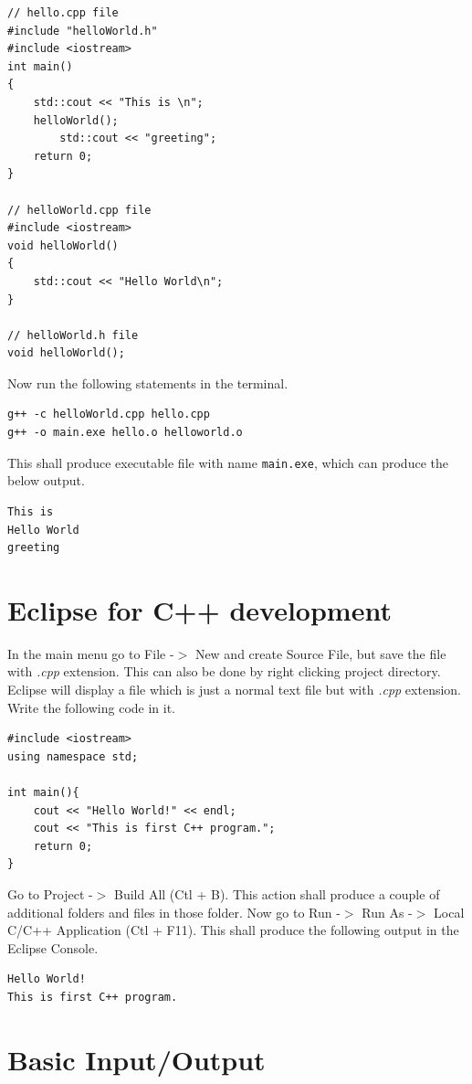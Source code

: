 \documentclass{book}
\begin{document}
\begin{verbatim}
// hello.cpp file
#include "helloWorld.h"
#include <iostream>
int main()
{
    std::cout << "This is \n";
    helloWorld();
		std::cout << "greeting"; 
    return 0;
}

// helloWorld.cpp file
#include <iostream>
void helloWorld()
{
    std::cout << "Hello World\n";
}

// helloWorld.h file
void helloWorld();
\end{verbatim}

Now run the following statements in the terminal. 

\begin{verbatim}
g++ -c helloWorld.cpp hello.cpp
g++ -o main.exe hello.o helloworld.o
\end{verbatim}

This shall produce executable file with name \texttt{main.exe}, which can produce the below output.  

\begin{verbatim}
This is
Hello World
greeting 
\end{verbatim}

\section{Eclipse for C++ development}

In the main menu go to File -$>$ New and create Source File, but save the file with \emph{.cpp} extension. This can also be done by right clicking project directory. Eclipse will display a file which is just a normal text file but with \emph{.cpp} extension. Write the following code in it. 

\begin{verbatim}
#include <iostream>
using namespace std;

int main(){
	cout << "Hello World!" << endl;
	cout << "This is first C++ program.";
	return 0;
}
\end{verbatim}

Go to Project -$>$ Build All (Ctl + B). This action shall produce a couple of additional folders and files in those folder. Now go to Run -$>$ Run As -$>$ Local C/C++ Application (Ctl + F11). This shall produce the following output in the Eclipse Console. 

\begin{verbatim}
Hello World!
This is first C++ program.
\end{verbatim}

\section{Basic Input/Output}
\end{document}
